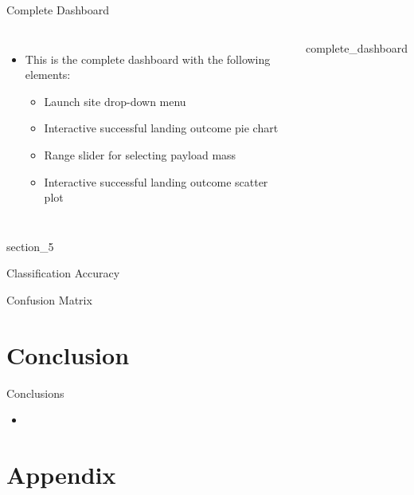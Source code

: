 \begin{frame}{Complete Dashboard}
    \begin{columns}
            \begin{itemize}
                \item This is the complete dashboard with the following elements:
                \begin{itemize}
                    \item Launch site drop-down menu
                    \item Interactive successful landing outcome pie chart
                    \item Range slider for selecting payload mass
                    \item Interactive successful landing outcome scatter plot
                \end{itemize}
            \end{itemize}
            {complete_dashboard}
    \end{columns}
\end{frame}

{
{section_5}
\begin{frame}[plain]
\end{frame}
}

\begin{frame}{Classification Accuracy}

\end{frame}

\begin{frame}{Confusion Matrix}

\end{frame}

\section{Conclusion}

\begin{frame}{Conclusions}
    \begin{itemize}
        \item
    \end{itemize}
\end{frame}

\section{Appendix}

